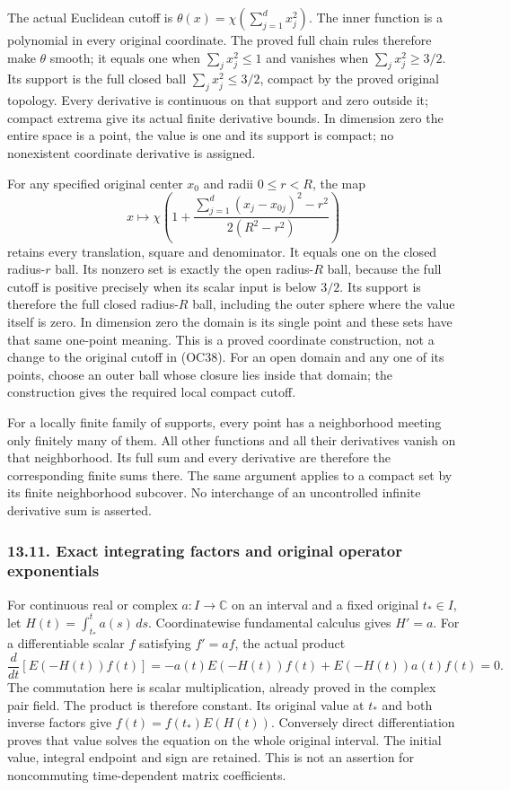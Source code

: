 \documentclass[
  11pt,
]{article}
\begin{document}
The actual Euclidean cutoff is \(\theta(x)=\chi(\sum_{j=1}^d x_j^2)\).
The inner function is a polynomial in every original coordinate. The
proved full chain rules therefore make \(\theta\) smooth; it equals one
when \(\sum_jx_j^2\le1\) and vanishes when \(\sum_jx_j^2\ge3/2\). Its
support is the full closed ball \(\sum_jx_j^2\le3/2\), compact by the
proved original topology. Every derivative is continuous on that support
and zero outside it; compact extrema give its actual finite derivative
bounds. In dimension zero the entire space is a point, the value is one
and its support is compact; no nonexistent coordinate derivative is
assigned.

For any specified original center \(x_0\) and radii \(0\le r<R\), the
map \[
 x\longmapsto
 \chi\left(1+\frac{\sum_{j=1}^d(x_j-x_{0j})^2-r^2}{2(R^2-r^2)}\right)
\tag{OC41}
\] retains every translation, square and denominator. It equals one on
the closed radius-\(r\) ball. Its nonzero set is exactly the open
radius-\(R\) ball, because the full cutoff is positive precisely when
its scalar input is below \(3/2\). Its support is therefore the full
closed radius-\(R\) ball, including the outer sphere where the value
itself is zero. In dimension zero the domain is its single point and
these sets have that same one-point meaning. This is a proved coordinate
construction, not a change to the original cutoff in (OC38). For an open
domain and any one of its points, choose an outer ball whose closure
lies inside that domain; the construction gives the required local
compact cutoff.

For a locally finite family of supports, every point has a neighborhood
meeting only finitely many of them. All other functions and all their
derivatives vanish on that neighborhood. Its full sum and every
derivative are therefore the corresponding finite sums there. The same
argument applies to a compact set by its finite neighborhood subcover.
No interchange of an uncontrolled infinite derivative sum is asserted.

\subsubsection{13.11. Exact integrating factors and original operator
exponentials}\label{exact-integrating-factors-and-original-operator-exponentials}

For continuous real or complex \(a:I\to\mathbb C\) on an interval and a
fixed original \(t_*\in I\), let \(H(t)=\int_{t_*}^ta(s)\,ds\).
Coordinatewise fundamental calculus gives \(H'=a\). For a differentiable
scalar \(f\) satisfying \(f'=a f\), the actual product \[
 \frac d{dt}[E(-H(t))f(t)]
 =-a(t)E(-H(t))f(t)+E(-H(t))a(t)f(t)=0.
\tag{OC42}
\] The commutation here is scalar multiplication, already proved in the
complex pair field. The product is therefore constant. Its original
value at \(t_*\) and both inverse factors give \(f(t)=f(t_*)E(H(t))\).
Conversely direct differentiation proves that value solves the equation
on the whole original interval. The initial value, integral endpoint and
sign are retained. This is not an assertion for noncommuting
time-dependent matrix coefficients.
\end{document}
